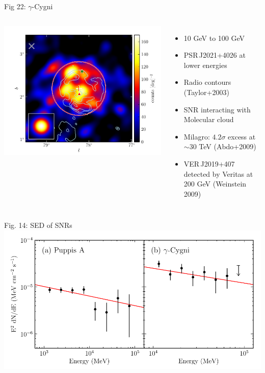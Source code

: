 \documentclass[12pt]{beamer}
\begin{document}
\begin{frame}{Fig 22: $\gamma$-Cygni}
  \begin{columns}

    \includegraphics[scale=0.50]{plots/source_Gamma_Cygni_color.pdf}


    \begin{itemize}
      \item 10 GeV to 100 GeV
      \item PSR\,J2021+4026 at lower energies
      \item Radio contours (Taylor+2003)
      \item SNR interacting with Molecular cloud
      \item Milagro: $4.2\sigma$ excess at $\sim 30$ TeV (Abdo+2009)
      \item 
        VER\,J2019+407 
        detected by Veritas at 200 GeV (Weinstein 2009)
      \end{itemize}
  \end{columns}
\end{frame}

\begin{frame}{Fig. 14: SED of SNRs}
  \includegraphics[scale=0.65]{plots/snr_seds_color.pdf}
\end{frame}
\end{document}
